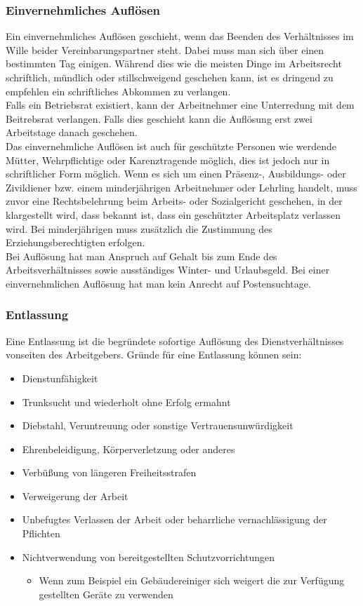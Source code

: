\documentclass{article}
\begin{document}
	\subsubsection{Einvernehmliches Auflösen}
	Ein einvernehmliches Auflösen geschieht, wenn das Beenden des Verhältnisses im Wille beider Vereinbarungspartner steht. Dabei muss man sich über einen bestimmten Tag einigen. Während dies wie die meisten Dinge im Arbeitsrecht schriftlich, mündlich oder stillschweigend geschehen kann, ist es dringend zu empfehlen ein schriftliches Abkommen zu verlangen. \\
	Falls ein Betriebsrat existiert, kann der Arbeitnehmer eine Unterredung mit dem Beitrebsrat verlangen. Falls dies geschieht kann die Auflösung erst zwei Arbeitstage danach geschehen. \\
	Das einvernehmliche Auflösen ist auch für geschützte Personen wie werdende Mütter, Wehrpflichtige oder Karenztragende möglich, dies ist jedoch nur in schriftlicher Form möglich. Wenn es sich um einen Präsenz-, Ausbildungs- oder Zivildiener bzw. einem minderjährigen Arbeitnehmer oder Lehrling handelt, muss zuvor eine Rechtsbelehrung beim Arbeits- oder Sozialgericht geschehen, in der klargestellt wird, dass bekannt ist, dass ein geschützter Arbeitsplatz verlassen wird. Bei minderjährigen muss zusätzlich die Zustimmung des Erziehungsberechtigten erfolgen. \\
	Bei Auflösung hat man Anspruch auf Gehalt bis zum Ende des Arbeitsverhältnisses sowie ausständiges Winter- und Urlaubsgeld. Bei einer einvernehmlichen Auflösung hat man kein Anrecht auf Postensuchtage.
	\subsubsection{Entlassung}
	Eine Entlassung ist die begründete sofortige Auflösung des Dienstverhältnisses vonseiten des Arbeitgebers. Gründe für eine Entlassung können sein:
	\begin{itemize}
		\item{Dienstunfähigkeit}
		\item{Trunksucht und wiederholt ohne Erfolg ermahnt}
		\item{Diebstahl, Veruntreuung oder sonstige Vertrauensunwürdigkeit}
		\item{Ehrenbeleidigung, Körperverletzung oder anderes}
		\item{Verbüßung von längeren Freiheitsstrafen}
		\item{Verweigerung der Arbeit}
		\item{Unbefugtes Verlassen der Arbeit oder beharrliche vernachlässigung der Pflichten}
		\item{Nichtverwendung von bereitgestellten Schutzvorrichtungen}
		\begin{itemize}
			\item{Wenn zum Beispiel ein Gebäudereiniger sich weigert die zur Verfügung gestellten Geräte zu verwenden}
		\end{itemize}
	\end{itemize}
\end{document}
